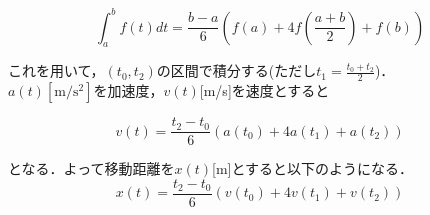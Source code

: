 \documentclass[11pt,a4]{jsarticle}
\begin{document}
\begin{equation}
 \int_a^b f(t) dt = \frac{b-a}{6} ( f(a)+4f ( \frac{a+b}{2}) +f(b))
\end{equation}

これを用いて，$(t_0,t_2)$の区間で積分する(ただし$t_1=\frac{t_0+t_2}{2}$)．\\
$a(t)[\mathrm{m}/\mathrm{s}^{2}]$を加速度，$v(t)$[m/s]を速度とすると

\begin{equation}
 v(t)= \frac{t_2-t_0}{6} ( a(t_0)+4a(t_1)+a(t_2) )
\end{equation}

となる．よって移動距離を$x(t)$[m]とすると以下のようになる．
\begin{equation}
 x(t)= \frac{t_2-t_0}{6}(v(t_0)+4v(t_1)+v(t_2))
\end{equation}
\end{document}
